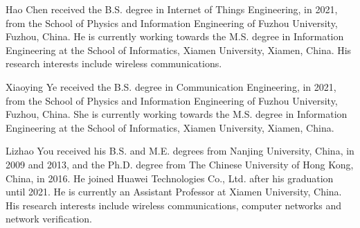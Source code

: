 \documentclass[10pt, journal, letterpaper]{IEEEtran}
\begin{document}
\begin{IEEEbiography}{Hao Chen}
	received the B.S. degree in Internet of Things Engineering, in 2021, from the School of Physics and Information Engineering of Fuzhou University, Fuzhou, China. He is currently working towards the M.S. degree in Information Engineering at the School of Informatics, Xiamen University, Xiamen, China. His research interests include wireless communications.
\end{IEEEbiography}
\begin{IEEEbiography}{Xiaoying Ye}
	received the B.S. degree in Communication Engineering, in 2021, from the School of Physics and Information Engineering of Fuzhou University, Fuzhou, China. She is currently working towards the M.S. degree in Information Engineering at the School of Informatics, Xiamen University, Xiamen, China. 
\end{IEEEbiography}

\begin{IEEEbiography}{Lizhao You}
	received his B.S. and M.E. degrees from Nanjing University, China, in 2009 and 2013, and the Ph.D. degree from The Chinese University of Hong Kong, China, in 2016. He joined Huawei Technologies Co., Ltd. after his graduation until 2021. He is currently an Assistant Professor at Xiamen University, China. His research interests include wireless communications, computer networks and network verification.
\end{IEEEbiography}
\end{document}
